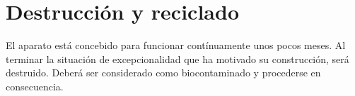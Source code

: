 \section{Destrucción y reciclado}
    El aparato está concebido para funcionar contínuamente  unos pocos meses. Al terminar la situación de excepcionalidad que ha motivado su construcción, será destruido. Deberá ser considerado como biocontaminado y procederse en consecuencia.
